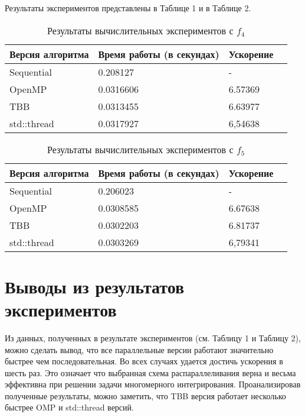 \documentclass{report}
\begin{document}
\par Результаты экспериментов представлены в Таблице 1 и в Таблице 2.
\begin{table}[!h]
\caption{Результаты вычислительных экспериментов с $f_4$}
\centering
\begin{tabular}{| p{2cm} | p{3cm} | p{4cm} | p{2cm} |}
\hline
Версия алгоритма & Время работы (в секундах) & Ускорение  \\[5pt]
\hline
Sequential        & 0.208127        & -         \\
OpenMP        & 0.0316606        & 6.57369          \\
TBB       & 0.0313455        & 6.63977         \\
std::thread        & 0.0317927        & 6,54638           \\

\hline
\end{tabular}
\end{table}

\begin{table}[!h]
\caption{Результаты вычислительных экспериментов с $f_5$}
\centering
\begin{tabular}{| p{2cm} | p{3cm} | p{4cm} | p{2cm} |}
\hline
Версия алгоритма & Время работы (в секундах) & Ускорение  \\[5pt]
\hline
Sequential      & 0.206023       & -         \\
OpenMP        & 0.0308585        & 6.67638          \\
TBB       & 0.0302203       & 6.81737         \\
std::thread        & 0.0303269        & 6,79341          \\

\hline
\end{tabular}
\end{table}

\newpage

\section*{Выводы из результатов экспериментов}
Из данных, полученных в результате экспериментов (см. Таблицу 1 и Таблицу 2), можно сделать вывод, что все параллельные версии работают значительно быстрее чем последовательная. Во всех случаях удается достичь ускорения в шесть раз. Это означает что выбранная схема распараллеливания верна и весьма эффективна при решении задачи многомерного интегрирования. Проанализировав полученные результаты, можно заметить, что TBB версия работает несколько быстрее OMP и std::thread версий.
\newpage
\end{document}
